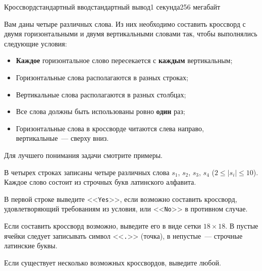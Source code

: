 \begin{problem}{Кроссворд}{стандартный ввод}{стандартный вывод}{1 секунда}{256 мегабайт}

Вам даны четыре различных слова. Из них необходимо составить кроссворд с двумя горизонтальными и двумя вертикальными словами так, чтобы выполнялись следующие условия:

\begin{itemize}
\item \textbf{Каждое} горизонтальное слово пересекается с \textbf{каждым} вертикальным;
\item Горизонтальные слова располагаются в разных строках;
\item Вертикальные слова располагаются в разных столбцах;
\item Все слова должны быть использованы ровно \textbf{один} раз;
\item Горизонтальные слова в кроссворде читаются слева направо, вертикальные~--- сверху вниз.
\end{itemize}

Для лучшего понимания задачи смотрите примеры.

\InputFile
В четырех строках записаны четыре различных слова $s_1$, $s_2$, $s_3$, $s_4$ ($2 \le \lvert s_i \rvert \le 10$). Каждое слово состоит из строчных букв латинского алфавита.

\OutputFile
В первой строке выведите <<\texttt{Yes}>>, если возможно составить кроссворд, удовлетворяющий требованиям из условия, или <<\texttt{No}>> в противном случае.

Если составить кроссворд возможно, выведите его в виде сетки $18 \times 18$. В пустые ячейки следует записывать символ <<\texttt{.}>> (точка), в непустые~--- строчные латинские буквы.

Если существует несколько возможных кроссвордов, выведите любой.

\Examples

\begin{example}
%
%
%
\end{example}

\end{problem}

